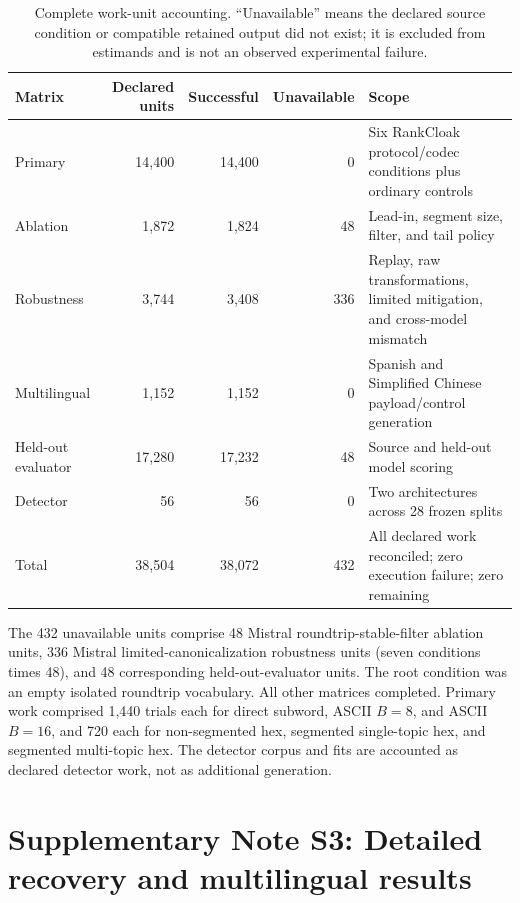 \documentclass[fleqn,10pt]{wlscirep}
\begin{document}
\begin{table}[H]
\centering
\small
\begin{tabularx}{\textwidth}{L{0.23\textwidth}r r r Y}
\toprule
Matrix & Declared units & Successful & Unavailable & Scope \\
\midrule
Primary & 14,400 & 14,400 & 0 & Six RankCloak protocol/codec conditions plus ordinary controls \\
Ablation & 1,872 & 1,824 & 48 & Lead-in, segment size, filter, and tail policy \\
Robustness & 3,744 & 3,408 & 336 & Replay, raw transformations, limited mitigation, and cross-model mismatch \\
Multilingual & 1,152 & 1,152 & 0 & Spanish and Simplified Chinese payload/control generation \\
Held-out evaluator & 17,280 & 17,232 & 48 & Source and held-out model scoring \\
Detector & 56 & 56 & 0 & Two architectures across 28 frozen splits \\
\midrule
Total & 38,504 & 38,072 & 432 & All declared work reconciled; zero execution failure; zero remaining \\
\bottomrule
\end{tabularx}
\caption{\label{tab:ledger}Complete work-unit accounting. “Unavailable” means the declared source condition or compatible retained output did not exist; it is excluded from estimands and is not an observed experimental failure.}
\end{table}

The 432 unavailable units comprise 48 Mistral roundtrip-stable-filter ablation units, 336 Mistral limited-canonicalization robustness units (seven conditions times 48), and 48 corresponding held-out-evaluator units. The root condition was an empty isolated roundtrip vocabulary. All other matrices completed. Primary work comprised 1,440 trials each for direct subword, ASCII \(B=8\), and ASCII \(B=16\), and 720 each for non-segmented hex, segmented single-topic hex, and segmented multi-topic hex. The detector corpus and fits are accounted as declared detector work, not as additional generation.

\section*{Supplementary Note S3: Detailed recovery and multilingual results}\label{si:s3}
\end{document}
